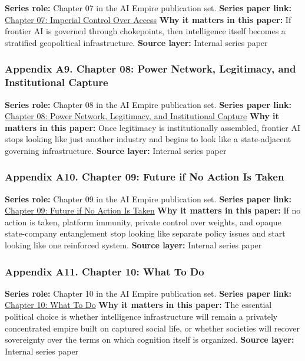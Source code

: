 \documentclass[
  american,
  11pt,
  letterpaper,
]{article}
\begin{document}
\textbf{Series role:} Chapter 07 in the AI Empire publication set.
\textbf{Series paper link:}
\href{07_imperial-control-over-access_paper.html}{Chapter 07: Imperial
Control Over Access} \textbf{Why it matters in this paper:} If frontier
AI is governed through chokepoints, then intelligence itself becomes a
stratified geopolitical infrastructure. \textbf{Source layer:} Internal
series paper

\subsubsection{Appendix A9. Chapter 08: Power Network, Legitimacy, and
Institutional
Capture}\label{appendix-a9-chapter-08-power-network-legitimacy-and-institutional-capture}

\textbf{Series role:} Chapter 08 in the AI Empire publication set.
\textbf{Series paper link:}
\href{08_legitimacy-and-institutional-capture_paper.html}{Chapter 08:
Power Network, Legitimacy, and Institutional Capture} \textbf{Why it
matters in this paper:} Once legitimacy is institutionally assembled,
frontier AI stops looking like just another industry and begins to look
like a state-adjacent governing infrastructure. \textbf{Source layer:}
Internal series paper

\subsubsection{Appendix A10. Chapter 09: Future if No Action Is
Taken}\label{appendix-a10-chapter-09-future-if-no-action-is-taken}

\textbf{Series role:} Chapter 09 in the AI Empire publication set.
\textbf{Series paper link:}
\href{09_future-if-unchecked_paper.html}{Chapter 09: Future if No Action
Is Taken} \textbf{Why it matters in this paper:} If no action is taken,
platform immunity, private control over weights, and opaque
state-company entanglement stop looking like separate policy issues and
start looking like one reinforced system. \textbf{Source layer:}
Internal series paper

\subsubsection{Appendix A11. Chapter 10: What To
Do}\label{appendix-a11-chapter-10-what-to-do}

\textbf{Series role:} Chapter 10 in the AI Empire publication set.
\textbf{Series paper link:}
\href{10_three-reform-program_paper.html}{Chapter 10: What To Do}
\textbf{Why it matters in this paper:} The essential political choice is
whether intelligence infrastructure will remain a privately concentrated
empire built on captured social life, or whether societies will recover
sovereignty over the terms on which cognition itself is organized.
\textbf{Source layer:} Internal series paper
\end{document}
